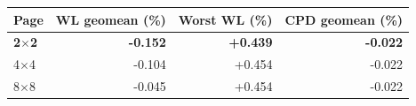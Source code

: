 \begin{tabular}{lrrr}
\toprule
Page & WL geomean (\%) & Worst WL (\%) & CPD geomean (\%) \\
\midrule
\textbf{2$\times$2} & \textbf{-0.152} & \textbf{+0.439} & \textbf{-0.022} \\
4$\times$4 & -0.104 & +0.454 & -0.022 \\
8$\times$8 & -0.045 & +0.454 & -0.022 \\
\bottomrule
\end{tabular}

